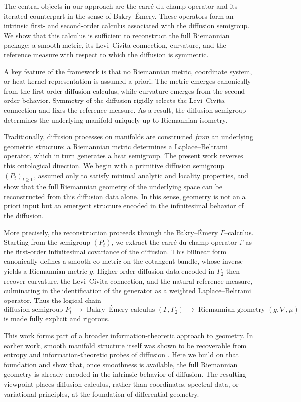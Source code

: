 \documentclass[11pt]{amsart}
\theoremstyle{definition}
\theoremstyle{remark}
\begin{document}
The central objects in our approach are the carré du champ operator and its
iterated counterpart in the sense of Bakry--\'Emery.
These operators form an intrinsic first- and second-order calculus associated
with the diffusion semigroup.
We show that this calculus is sufficient to reconstruct the full Riemannian
package: a smooth metric, its Levi--Civita connection, curvature, and the
reference measure with respect to which the diffusion is symmetric.

A key feature of the framework is that no Riemannian metric, coordinate system,
or heat kernel representation is assumed a priori.
The metric emerges canonically from the first-order diffusion calculus, while
curvature emerges from the second-order behavior.
Symmetry of the diffusion rigidly selects the Levi--Civita connection and fixes
the reference measure.
As a result, the diffusion semigroup determines the underlying manifold uniquely
up to Riemannian isometry.

Traditionally, diffusion processes on manifolds are constructed \emph{from} an
underlying geometric structure: a Riemannian metric determines a Laplace--Beltrami
operator, which in turn generates a heat semigroup.
The present work reverses this ontological direction.
We begin with a primitive diffusion semigroup $(P_t)_{t\ge0}$, assumed only to
satisfy minimal analytic and locality properties, and show that the full
Riemannian geometry of the underlying space can be reconstructed from this
diffusion data alone.
In this sense, geometry is not an a priori input but an emergent structure
encoded in the infinitesimal behavior of the diffusion.

More precisely, the reconstruction proceeds through the Bakry--\'Emery
$\Gamma$--calculus.
Starting from the semigroup $(P_t)$, we extract the carré du champ operator
$\Gamma$ as the first-order infinitesimal covariance of the diffusion.
This bilinear form canonically defines a smooth co-metric on the cotangent
bundle, whose inverse yields a Riemannian metric $g$.
Higher-order diffusion data encoded in $\Gamma_2$ then recover curvature, the
Levi--Civita connection, and the natural reference measure, culminating in the
identification of the generator as a weighted Laplace--Beltrami operator.
Thus the logical chain
\[
\text{diffusion semigroup } P_t
\;\longrightarrow\;
\text{Bakry--\'Emery calculus } (\Gamma,\Gamma_2)
\;\longrightarrow\;
\text{Riemannian geometry } (g,\nabla,\mu)
\]
is made fully explicit and rigorous.

This work forms part of a broader information-theoretic approach to geometry.
In earlier work, smooth manifold structure itself was shown to be recoverable
from entropy and information-theoretic probes of diffusion
\cite{SanghaEntropySmooth}.
Here we build on that foundation and show that, once smoothness is available,
the full Riemannian geometry is already encoded in the intrinsic behavior of
diffusion.
The resulting viewpoint places diffusion calculus, rather than coordinates,
spectral data, or variational principles, at the foundation of differential
geometry.
\end{document}
